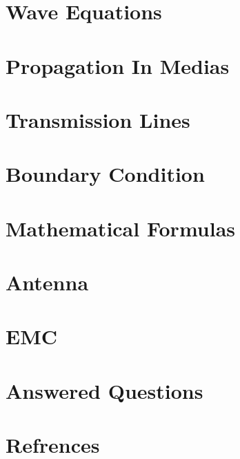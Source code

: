 \documentclass{article}
\begin{document}
\pagecolor{mainTheme}\afterpage{\pagecolor{backCirc}}
\maketitle
\thispagestyle{empty}


\section{Wave Equations}


\vspace{10pt}
\section{Propagation In Medias}


\section{Transmission Lines}


\section{Boundary Condition}




\vspace{10pt}
\section{Mathematical Formulas}


\vspace{10pt}
\section{Antenna}



\section{EMC}


\vspace{10pt}
\section{Answered Questions}


\section{Refrences}\vspace{0.5em}

\end{document}
